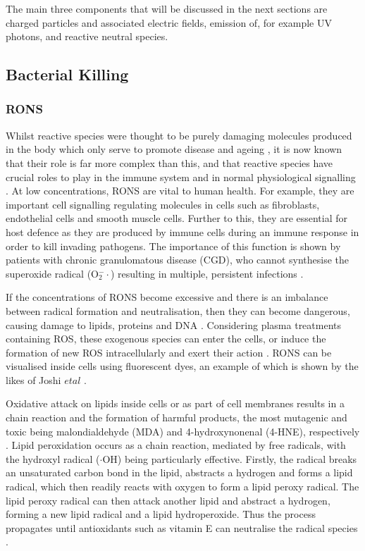 \documentclass[11pt, oneside]{article}   	%
\begin{document}
The main three components that will be discussed in the next sections are charged particles and associated electric fields, emission of, for example UV photons, and reactive neutral species.


\subsection{Bacterial Killing}
\subsubsection{RONS}
Whilst reactive species were thought to be purely damaging molecules produced in the body which only serve to promote disease and ageing \cite{Harman1955aging}, it is now known that their role is far more complex than this, and that reactive species have crucial roles to play in the immune system and in normal physiological signalling \cite{Thannickal2000reactive}.
At low concentrations, RONS are vital to human health. 
For example, they are important cell signalling regulating molecules in cells such as fibroblasts, endothelial cells and smooth muscle cells.
Further to this, they are essential for host defence as they are produced by immune cells during an immune response in order to kill invading pathogens.
The importance of this function is shown by patients with chronic granulomatous disease (CGD), who cannot synthesise the superoxide radical (O$_2^-\cdot$) resulting in multiple, persistent infections \cite{PhamHuy2008free, Fang2004antimicrobial}.


If the concentrations of RONS become excessive and there is an imbalance between radical formation and neutralisation, then they can become dangerous, causing damage to lipids, proteins and DNA \cite{PhamHuy2008free}.
Considering plasma treatments containing ROS, these exogenous species can enter the cells, or induce the formation of new ROS intracellularly and exert their action \cite{Haertel2014nonthermal}.
RONS can be visualised inside cells using fluorescent dyes, an example of which is shown by the likes of Joshi $et al$ \cite{Joshi2010control}.

Oxidative attack on lipids inside cells or as part of cell membranes results in a chain reaction and the formation of harmful products, the most mutagenic and toxic being malondialdehyde (MDA) and 4-hydroxynonenal (4-HNE), respectively \cite{Ayala2014lipid}.
Lipid peroxidation occurs as a chain reaction, mediated by free radicals, with the hydroxyl radical ($\cdot$OH) being particularly effective.
Firstly, the radical breaks an unsaturated carbon bond in the lipid, abstracts a hydrogen and forms a lipid radical, which then readily reacts with oxygen to form a lipid peroxy radical.
The lipid peroxy radical can then attack another lipid and abstract a hydrogen, forming a new lipid radical and a lipid hydroperoxide. 
Thus the process propagates until antioxidants such as vitamin E can neutralise the radical species \cite{Ayala2014lipid}.
\end{document}
